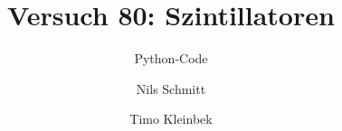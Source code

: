 \documentclass[10pt]{scrartcl}			%
\title{Versuch 80: Szintillatoren}
\subtitle{Python-Code}
\author{Nils Schmitt \and Timo Kleinbek}
\date{}
\begin{document}
\centering






















\end{document}
